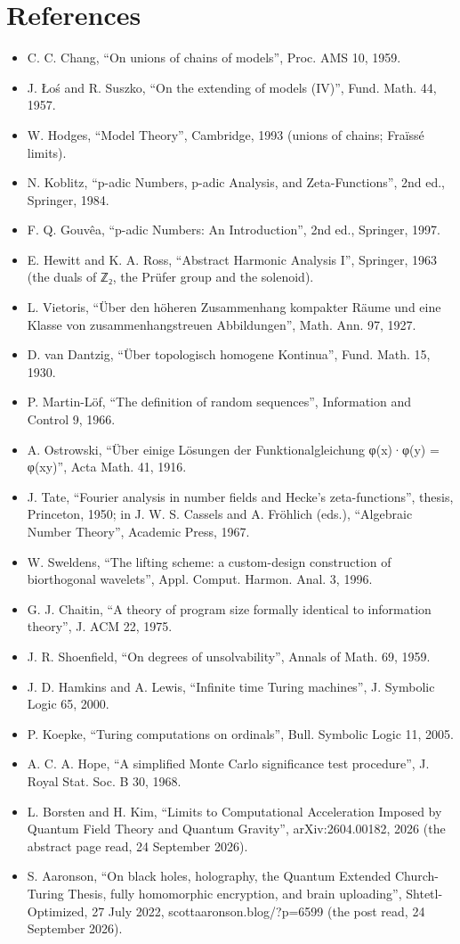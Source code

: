 \section{\texorpdfstring{References}{References}}

\begin{itemize}
\item C. C. Chang, “On unions of chains of models”, Proc. AMS 10, 1959.
\item J. Łoś and R. Suszko, “On the extending of models (IV)”, Fund. Math. 44, 1957.
\item W. Hodges, “Model Theory”, Cambridge, 1993 (unions of chains; Fraïssé limits).
\item N. Koblitz, “p-adic Numbers, p-adic Analysis, and Zeta-Functions”, 2nd ed., Springer, 1984.
\item F. Q. Gouvêa, “p-adic Numbers: An Introduction”, 2nd ed., Springer, 1997.
\item E. Hewitt and K. A. Ross, “Abstract Harmonic Analysis I”, Springer, 1963 (the duals of ℤ₂, the Prüfer group and the solenoid).
\item L. Vietoris, “Über den höheren Zusammenhang kompakter Räume und eine Klasse von zusammenhangstreuen Abbildungen”, Math. Ann. 97, 1927.
\item D. van Dantzig, “Über topologisch homogene Kontinua”, Fund. Math. 15, 1930.
\item P. Martin-Löf, “The definition of random sequences”, Information and Control 9, 1966.
\item A. Ostrowski, “Über einige Lösungen der Funktionalgleichung φ(x)·φ(y) = φ(xy)”, Acta Math. 41, 1916.
\item J. Tate, “Fourier analysis in number fields and Hecke's zeta-functions”, thesis, Princeton, 1950; in J. W. S. Cassels and A. Fröhlich (eds.), “Algebraic Number Theory”, Academic Press, 1967.
\item W. Sweldens, “The lifting scheme: a custom-design construction of biorthogonal wavelets”, Appl. Comput. Harmon. Anal. 3, 1996.
\item G. J. Chaitin, “A theory of program size formally identical to information theory”, J. ACM 22, 1975.
\item J. R. Shoenfield, “On degrees of unsolvability”, Annals of Math. 69, 1959.
\item J. D. Hamkins and A. Lewis, “Infinite time Turing machines”, J. Symbolic Logic 65, 2000.
\item P. Koepke, “Turing computations on ordinals”, Bull. Symbolic Logic 11, 2005.
\item A. C. A. Hope, “A simplified Monte Carlo significance test procedure”, J. Royal Stat. Soc. B 30, 1968.
\item L. Borsten and H. Kim, “Limits to Computational Acceleration Imposed by Quantum Field Theory and Quantum Gravity”, arXiv:2604.00182, 2026 (the abstract page read, 24 September 2026).
\item S. Aaronson, “On black holes, holography, the Quantum Extended Church-Turing Thesis, fully homomorphic encryption, and brain uploading”, Shtetl-Optimized, 27 July 2022, scottaaronson.blog/?p=6599 (the post read, 24 September 2026).
\end{itemize}
